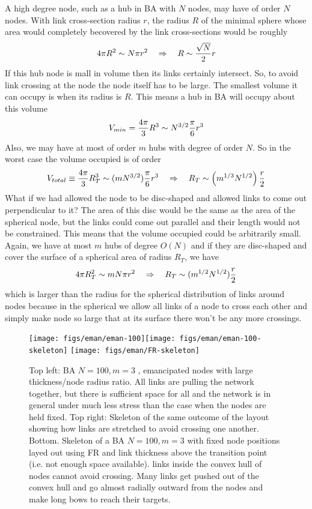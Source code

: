 \documentclass[nofootinbib,preprint,floatfix,titlepage,endfloats,superscriptaddress]{revtex4} %
\begin{document}
A high degree node, such as a hub in BA with $N$ nodes, may have of order $N$ nodes. With link cross-section radius $r$, the radius $R$ of the minimal sphere whose area would completely becovered by the link cross-sections would be roughly 
\[4 \pi R^2 \sim N \pi r^2 \quad \Rightarrow \quad R \sim {\sqrt{N}\over 2} r \]
If this hub node is mall in volume then its links certainly intersect. So, to avoid link crossing at the node the node itself has to be large. The smallest volume it can occupy is when its radius is $R$. This means a hub in BA will occupy about this volume
\[V_{min} = {4\pi\over 3} R^3 \sim N^{3/2} {\pi\over 6 } r^3 \]
Also, we may have at most of order $m$ hubs with degree of order $N$. So in the worst case the volume occupied is of order
\[V_{total} \equiv {4\pi \over 3} R_T^3 \sim (mN^{3/2}) {\pi\over 6 }r^3 \quad \Rightarrow  \quad R_T \sim \left(m^{1/3} N^{1/2}\right) {r\over 2 } \]
What if we had allowed the node to be disc-shaped and allowed links to come out perpendicular to it? The area of this disc would be the same as the area of the spherical node, but the links could come out parallel and their length would not be constrained. This means that the volume occupied could be arbitrarily small. Again, we have at most $m$ hubs of degree $O(N)$ and if they are disc-shaped and cover the surface of a spherical area of radius $R_T$, we have
\[4\pi R_T^2 \sim m N \pi r^2\quad \Rightarrow\quad  R_T \sim (m^{1/2} N^{1/2}) {r\over 2} \]
which is larger than the radius for the spherical distribution of links around nodes because in the spherical we allow all links of a node to cross each other and simply make node so large that at its surface there won't be any more crossings. 



\begin{figure}
    \centering
    \texttt{[image: figs/eman/eman-100]}\texttt{[image: figs/eman/eman-100-skeleton]}   
    \texttt{[image: figs/eman/FR-skeleton]}
    
    \caption{Top left: BA $N=100, m=3$ , emancipated nodes with large thickness/node radius ratio. All links are pulling the network together, but there is sufficient space for all and the network is in general under much less stress than the case when the nodes are held fixed. Top right: Skeleton of the same outcome of the layout showing how links are stretched to avoid crossing one another. Bottom. Skeleton of a BA $N=100,m=3$ with fixed node positions layed out using FR and link thickness above the transition point (i.e. not enough space available). links inside the convex hull of nodes cannot avoid crossing. Many links get pushed out of the convex hull and go almost radially outward from the nodes and make long bows to reach their targets.    }
    \label{fig:skeletons}
\end{figure}
\end{document}

